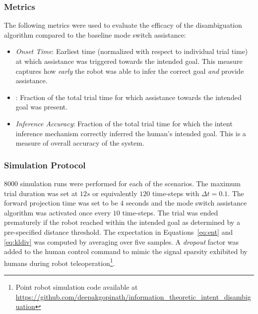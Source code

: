 \documentclass[letterpaper, 10 pt, conference]{ieeeconf}  %
\begin{document}
\subsubsection{Metrics}
The following metrics were used to evaluate the efficacy of the disambiguation algorithm compared to the baseline mode switch assistance:
\begin{itemize}
	\item \textit{Onset Time}: Earliest time (normalized with respect to individual trial time) at which assistance  was triggered towards the intended goal. This measure captures how \textit{early} the robot was able to infer the correct goal  \textit{and} provide assistance. 
	\item \textit{}: Fraction of the total trial time for which assistance towards the intended goal was present.  
	\item \textit{Inference Accuracy}: Fraction of the total trial time for which the intent inference mechanism correctly inferred the human's intended goal. This is a measure of overall accuracy of the system. 
\end{itemize}

\subsubsection{Simulation Protocol}
8000 simulation runs were performed for each of the scenarios. 
The maximum trial duration was set at $12s$ or equivalently $120$ time-steps with $\Delta t = 0.1$. The forward projection time was set to be $4$ seconds and the mode switch assistance algorithm was activated once every $10$ time-steps. The trial was ended prematurely if the robot reached within the intended goal as determined by a pre-specified distance threshold. The expectation in Equations~\ref{eq:ent} and \ref{eq:kldiv} was computed by averaging over five samples.  A \textit{dropout} factor was added to the human control command to mimic the signal sparsity exhibited by humans during robot teleoperation\footnote{Point robot simulation code available at \url{https://github.com/deepakgopinath/information_theoretic_intent_disambiguation}}. 
\end{document}
